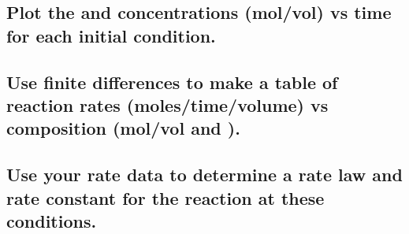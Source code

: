 \documentclass[11pt]{article}
\begin{document}
\subsection{Plot the  and  concentrations (mol/vol) vs time for each initial condition.}
\label{sec:org574d394}

\subsection{Use finite differences to make a table of reaction rates (moles/time/volume) vs composition (mol/vol  and ).}
\label{sec:orgbcc826c}

\subsection{Use your rate data to determine a rate law and rate constant for the reaction at these conditions.}
\label{sec:org4061cb0}
\end{document}
